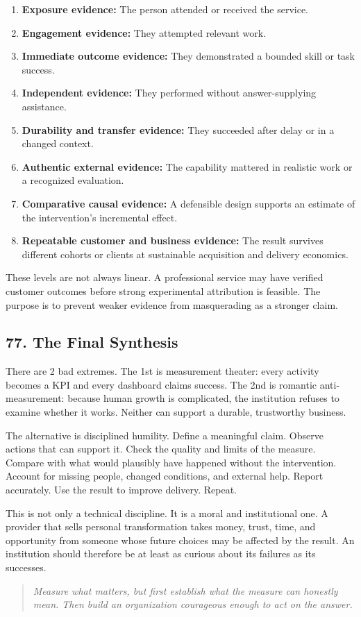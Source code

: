 \begin{enumerate}[leftmargin=2em, itemsep=0.4em]
    \item \textbf{Exposure evidence:} The person attended or received the service.
    \item \textbf{Engagement evidence:} They attempted relevant work.
    \item \textbf{Immediate outcome evidence:} They demonstrated a bounded skill or task success.
    \item \textbf{Independent evidence:} They performed without answer-supplying assistance.
    \item \textbf{Durability and transfer evidence:} They succeeded after delay or in a changed context.
    \item \textbf{Authentic external evidence:} The capability mattered in realistic work or a recognized evaluation.
    \item \textbf{Comparative causal evidence:} A defensible design supports an estimate of the intervention's incremental effect.
    \item \textbf{Repeatable customer and business evidence:} The result survives different cohorts or clients at sustainable acquisition and delivery economics.
\end{enumerate}

These levels are not always linear. A professional service may have verified customer outcomes before strong experimental attribution is feasible. The purpose is to prevent weaker evidence from masquerading as a stronger claim.

\subsection*{77. The Final Synthesis}

There are 2 bad extremes. The 1st is measurement theater: every activity becomes a KPI and every dashboard claims success. The 2nd is romantic anti-measurement: because human growth is complicated, the institution refuses to examine whether it works. Neither can support a durable, trustworthy business.

The alternative is disciplined humility. Define a meaningful claim. Observe actions that can support it. Check the quality and limits of the measure. Compare with what would plausibly have happened without the intervention. Account for missing people, changed conditions, and external help. Report accurately. Use the result to improve delivery. Repeat.

This is not only a technical discipline. It is a moral and institutional one. A provider that sells personal transformation takes money, trust, time, and opportunity from someone whose future choices may be affected by the result. An institution should therefore be at least as curious about its failures as its successes.

\begin{quote}
\itshape
Measure what matters, but first establish what the measure can honestly mean. Then build an organization courageous enough to act on the answer.
\end{quote}
